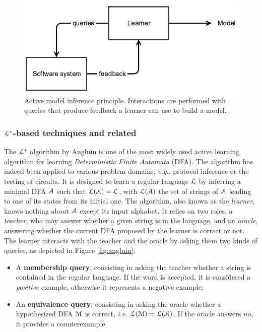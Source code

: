 \begin{figure}[h]
    \begin{center}
        \includegraphics[width=1.0\linewidth]{figures/active.png}
    \end{center}

    \caption{Active model inference principle. Interactions are
        performed with queries that produce feedback a learner
        can use to build a model.}
    \label{fig:active}
\end{figure}

\subsubsection{$\EuScript{L}^*$-based techniques and related}
\label{sec:active-letoile}

The $\EuScript{L}^*$ algorithm by Angluin \cite{Angluin198787} is
one of the most widely used active learning algorithm for
learning \textit{Deterministic Finite Automata} (DFA). The
algorithm has indeed been applied to various problem domains,
\emph{e.g.}, protocol inference or the testing of circuits. It is
designed to learn a regular language $\EuScript{L}$ by inferring
a minimal DFA $\EuScript{A}$ such that
$\EuScript{L}(\EuScript{A})=\EuScript{L}$, with
$\EuScript{L}(\EuScript{A})$ the set of strings of $\EuScript{A}$
leading to one of its states from its initial one. The algorithm,
also known as the \textit{learner}, knows nothing about
$\EuScript{A}$ except its input alphabet. It relies on two roles,
a \textit{teacher}, who may answer whether a given string is in
the language, and an \textit{oracle}, answering whether the
current DFA proposed by the learner is correct or not. The
learner interacts with the teacher and the oracle by asking them
two kinds of queries, as depicted in Figure \ref{fig:angluin}:

\begin{itemize}
    \item A \textbf{membership query}, consisting in asking the
        teacher whether a string is contained in the regular
        language.  If the word is accepted, it is considered a
        \textit{positive} example, otherwise it represents a
        negative example;

    \item An \textbf{equivalence query}, consisting in asking the
        oracle whether a hypothesized DFA $\EuScript{M}$ is
        correct, \emph{i.e.} $\EuScript{L}(\EuScript{M}) =
        \EuScript{L}(\EuScript{A})$. If the oracle answers $no$,
        it provides a counterexample.
\end{itemize}

